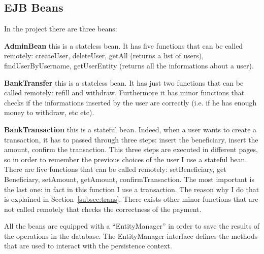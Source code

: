 \documentclass[a4paper]{article}
\begin{document}
\subsection{EJB Beans}
\label{subsec:ejb}
In the project there are three beans:
\begin{compactitem}
  \item \textbf{AdminBean} this is a stateless bean. It has five functions that can be called remotely: createUser, deleteUser, getAll (returns a list of users), findUserByUsername, getUserEntity (returns all the informations about a user).
  \item \textbf{BankTransfer} this is a stateless bean. It has just two functions that can be called remotely: refill and withdraw. Furthermore it has minor functions that checks if the informations inserted by the user are correctly (i.e. if he has enough money to withdraw, etc etc). 
  \item \textbf{BankTransaction} this is a stateful bean. Indeed, when a user wants to create a transaction, it has to passed through three steps: insert the beneficiary, insert the amount, confirm the transaction. This three steps are executed in different pages, so in order to remember the previous choices of the user I use a stateful bean. There are five functions that can be called remotely: setBeneficiary, get Beneficiary, setAmount, getAmount, confirmTransaction. The most important is the last one: in fact in this function I use a transaction. The reason why I do that is explained in Section~\ref{subsec:trans}. There exists other minor functions that are not called remotely that checks the correctness of the payment.
\end{compactitem}

All the beans are equipped with a ``EntityManager'' in order to save the results of the operations in the database. The EntityManager interface defines the methods that are used to interact with the persistence context.
\end{document}

